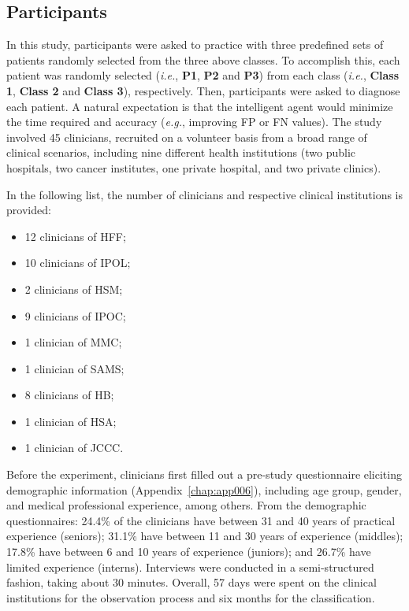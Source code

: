 \subsection{Participants}
\label{sec:chap005005001}

In this study, participants were asked to practice with three predefined sets of patients randomly selected from the three above classes.
To accomplish this, each patient was randomly selected ({\it i.e.}, {\bf P1}, {\bf P2} and {\bf P3}) from each class ({\it i.e.}, {\bf Class 1}, {\bf Class 2} and {\bf Class 3}), respectively.
Then, participants were asked to diagnose each patient.
A natural expectation is that the intelligent agent would minimize the time required and accuracy ({\it e.g.}, improving \ac{FP} or \ac{FN} values).
The study involved 45 clinicians, recruited on a volunteer basis from a broad range of clinical scenarios, including nine different health institutions (two public hospitals, two cancer institutes, one private hospital, and two private clinics).

\vspace{4.00mm}

\noindent
In the following list, the number of clinicians and respective clinical institutions is provided:

\vspace{2.00mm}

\begin{multicols}{2}
\begin{itemize}
\item 12 clinicians of \acs{HFF};  %
\item 10 clinicians of \acs{IPOL}; %
\item 2 clinicians of \acs{HSM};   %
\item 9 clinicians of \acs{IPOC};  %
\item 1 clinician of \acs{MMC};    %
\item 1 clinician of \acs{SAMS};   %
\item 8 clinicians of \acs{HB};    %
\item 1 clinician of \acs{HSA};    %
\item 1 clinician of \acs{JCCC}.   %
\end{itemize}
\end{multicols}

\vspace{2.00mm}

Before the experiment, clinicians first filled out a pre-study questionnaire eliciting demographic information (Appendix~\ref{chap:app006}), including age group, gender, and medical professional experience, among others.
From the demographic questionnaires:
24.4\% of the clinicians have between 31 and 40 years of practical experience (seniors);
31.1\% have between 11 and 30 years of experience (middles);
17.8\% have between 6 and 10 years of experience (juniors); and
26.7\% have limited experience (interns).
Interviews were conducted in a semi-structured fashion, taking about 30 minutes.
Overall, 57 days were spent on the clinical institutions for the observation process and six months for the classification.


